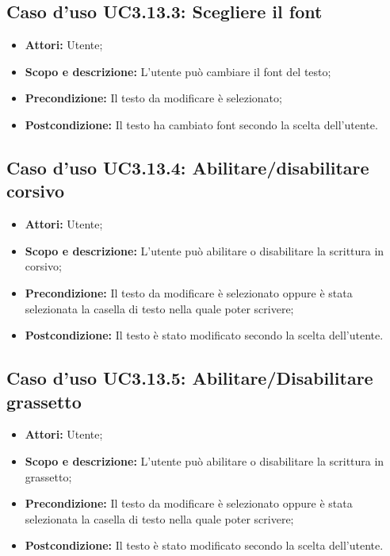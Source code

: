 \subsection{Caso d'uso UC3.13.3: Scegliere il font}
\begin{itemize}
	\item \textbf{Attori:} Utente;
	\item \textbf{Scopo e descrizione:} L'utente può cambiare il font del testo;
	\item \textbf{Precondizione:} Il testo da modificare è selezionato;
	\item \textbf{Postcondizione:} Il testo ha cambiato font secondo la scelta dell'utente.
\end{itemize}

\subsection{Caso d'uso UC3.13.4: Abilitare/disabilitare corsivo}
\begin{itemize}
	\item \textbf{Attori:} Utente;
	\item \textbf{Scopo e descrizione:} L'utente può abilitare o disabilitare la scrittura in corsivo;
	\item \textbf{Precondizione:} Il testo da modificare è selezionato oppure è stata selezionata la casella di testo nella quale poter scrivere;
	\item \textbf{Postcondizione:} Il testo è stato modificato secondo la scelta dell'utente.
\end{itemize}

\subsection{Caso d'uso UC3.13.5: Abilitare/Disabilitare grassetto}
\begin{itemize}
	\item \textbf{Attori:} Utente;
	\item \textbf{Scopo e descrizione:} L'utente può abilitare o disabilitare la scrittura in grassetto;
	\item \textbf{Precondizione:} Il testo da modificare è selezionato oppure è stata selezionata la casella di testo nella quale poter scrivere;
	\item \textbf{Postcondizione:} Il testo è stato modificato secondo la scelta dell'utente.
\end{itemize}

